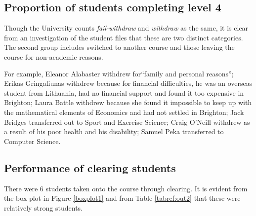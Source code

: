 \documentclass[12pt, a4paper, oneside]{article}\usepackage[]{graphicx}\usepackage[]{color}
\begin{document}
\subsection*{Proportion of students completing level 4}
Though the University counts \emph{fail-withdraw} and \emph{withdraw} as the same, it is clear from an investigation of the student files that these are two distinct categories.  The second group includes switched to another course and those leaving the course for non-academic reasons. 

For example, Eleanor Alabaster withdrew for``family and personal reasons'';  Erikas Gringaliunas withdrew because for financial difficulties, he was an overseas student from Lithuania, had no financial support and found it too expensive in Brighton; Laura Battle withdrew because she found it impossible to keep up with the mathematical elements of Economics and had not settled in Brighton; Jack Bridges transferred out to Sport and Exercise Science; Craig O'Neill withdrew as a result of his poor health and his disability; Samuel Peka transferred to Computer Science. 

\subsection*{Performance of clearing students}
There were 6 students taken  onto the course through clearing.  It is evident from the box-plot in Figure \ref{boxplot1} and from Table \ref{tabref:out2} that these were relatively strong students.   
\end{document}
